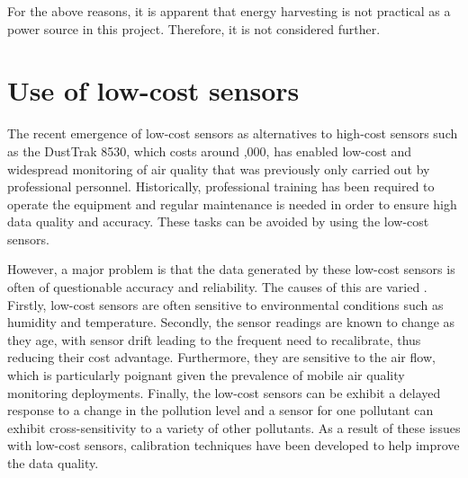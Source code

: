 \documentclass[11pt]{report}
\begin{document}
For the above reasons, it is apparent that energy harvesting is not practical as a power source in this project. Therefore, it is not considered further.






\section{Use of low-cost sensors} \label{lowcostsensors}

The recent emergence of low-cost sensors as alternatives to high-cost sensors such as the DustTrak 8530, which costs around ,000, has enabled low-cost and widespread monitoring of air quality that was previously only carried out by professional personnel. Historically, professional training has been required to operate the equipment and regular maintenance is needed in order to ensure high data quality and accuracy. These tasks can be avoided by using the low-cost sensors.

However, a major problem is that the data generated by these low-cost sensors is often of questionable accuracy and reliability. The causes of this are varied \citep{Clements2017lowcostworkshop}. Firstly, low-cost sensors are often sensitive to   environmental conditions such as humidity and temperature. Secondly, the sensor readings are known to change as they age, with sensor drift leading to the frequent need to recalibrate, thus reducing their cost advantage. Furthermore, they are sensitive to the air flow, which is particularly poignant given the prevalence of mobile air quality monitoring deployments. Finally, the low-cost sensors can be exhibit a delayed response to a change in the pollution level and a sensor for one pollutant can exhibit cross-sensitivity to a variety of other pollutants. As a result of these issues with low-cost sensors, calibration techniques have been developed to help improve the data quality.
\end{document}
